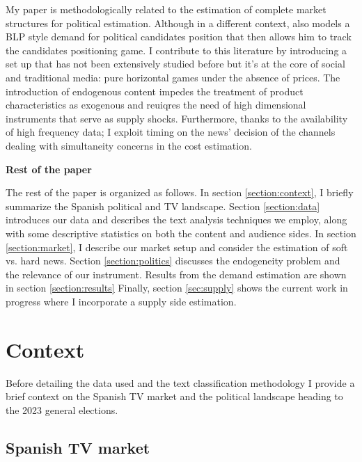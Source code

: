 \documentclass[12pt]{article}
\begin{document}
	
My paper is methodologically related to the estimation of complete market structures for political estimation. Although in a different context, \cite{longuet-marx2025party} also models a BLP \citep{berry1994estimating} style demand for political candidates position that then allows him to track the candidates positioning game. I contribute to this literature by introducing a set up that has not been extensively studied before but it's at the core of social and traditional media: pure horizontal games under the absence of prices. The introduction of endogenous content impedes the treatment of product characteristics as exogenous and reuiqres the need of high dimensional instruments that serve as supply shocks. Furthermore, thanks to the availability of high frequency data; I exploit timing on the news' decision of the channels dealing with simultaneity concerns in the cost estimation. 
	

	
	
	
	\textbf{Rest of the paper}
	
	
	The rest of the paper is organized as follows. In section \ref{section:context}, I briefly summarize the Spanish political and TV landscape. Section \ref{section:data} introduces our data and describes the text analysis techniques we employ, along with some descriptive statistics on both the content and audience sides. In section \ref{section:market}, I describe our market setup and consider the estimation of soft vs. hard news. Section \ref{section:politics} discusses the endogeneity problem and the relevance of our instrument. Results from the demand estimation are shown in section \ref{section:results} Finally, section \ref{sec:supply} shows the current work in progress where I incorporate a supply side estimation.
	
	
	
	
	
	\section{Context} 
	
	
	Before detailing the data used and the text classification methodology I provide a brief context on the Spanish TV market and the political landscape heading to the 2023 general elections. 
	
	
	\label{section:context}
	
	
	\subsection*{Spanish TV market}
	
\end{document}
